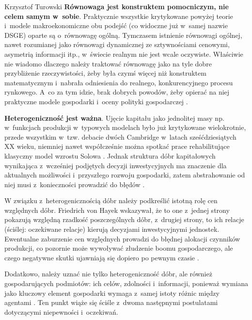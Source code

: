 \begin{artplenv}{Krzysztof Turowski}
\textbf{Równowaga jest konstruktem pomocniczym, nie celem samym w~sobie}. Praktycznie wszystkie krytykowane powyżej
teorie i~modele makroekonomiczne obu podejść (co widoczne już w~samej nazwie DSGE) oparte są o~równowagę ogólną.
Tymczasem istnienie równowagi ogólnej, nawet rozumianej jako równowagi dynamicznej ze sztywnościami cenowymi, asymetrią
informacji itp., w~świecie realnym nie jest wcale oczywiste. Właściwie nie wiadomo dlaczego należy traktować równowagę
jako na tyle dobre przybliżenie rzeczywistości, żeby była czymś więcej niż konstruktem matematycznym i~nabrała
odniesienia do realnego, konkurencyjnego procesu rynkowego. A~co za tym idzie, brak dobrych powodów, żeby opierać na
niej praktyczne modele gospodarki i~oceny polityki gospodarczej
\parencite{blaug_formalist_2003_tur}.

\textbf{Heterogeniczność jest ważna}. Ujęcie kapitału jako jednolitej masy np. w~funkcjach produkcji w~typowych modelach
było już krytykowane wielokrotnie, przede wszystkim w~tzw. debacie dwóch Cambridge w~latach sześćdziesiątych XX wieku,
niemniej nawet współcześnie można spotkać prace rehabilitujące klasyczny model wzrostu Solowa
\parencite{mankiw_contribution_1992}.
Jednak struktura dóbr kapitałowych wynikająca z~wcześniej podjętych
decyzji inwestycyjnych ma znaczenie dla aktualnych możliwości i~przyszłego rozwoju gospodarki, zatem abstrahowanie od
niej musi z~konieczności prowadzić do błędów
\parencite{skousen_structure_2007}.

W związku z~heterogenicznością dóbr należy podkreślić istotną rolę cen względnych dóbr. Friedrich von Hayek wskazywał,
że to one z~jednej strony pokazują względną rzadkość poszczególnych dóbr, z~drugiej strony, to ich relacje (ściślej:
oczekiwane relacje) kierują decyzjami inwestycyjnymi jednostek. Ewentualne zaburzenie cen względnych prowadzi do
błędnej alokacji czynników produkcji, co pozornie może wywoływać złudzenie boomu gospodarczego, ale czego negatywne
skutki ujawniają się dopiero po pewnym czasie
\parencite{hayek_prices_1931,mises_ludzkie_2007}.

Dodatkowo, należy uznać nie tylko heterogeniczność dóbr, ale również gospodarujących podmiotów: ich celów,
zdolności i~informacji, ponieważ wymiana jako kluczowy element gospodarki wymaga z~samej istoty różnic między agentami
\parencite{colander_financial_2009}.
Ten punkt wiąże się ściśle z~dwoma następnymi
postulatami dotyczącymi niepewności i~oczekiwań.


\end{artplenv}

